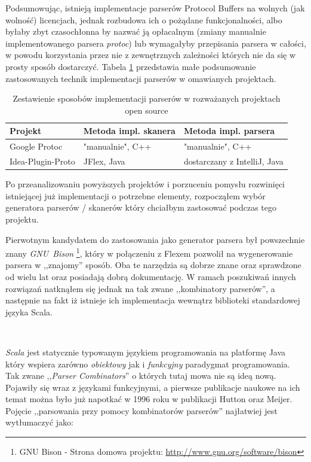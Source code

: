 \documentclass[pdflatex,11pt]{aghdpl}
\begin{document}
Podsumowując, istnieją implementacje parserów Protocol Buffers na wolnych (jak wolność) licencjach, jednak rozbudowa ich o pożądane funkcjonalności,
albo byłaby zbyt czasochłonna by nazwać ją opłacalnym (zmiany manualnie implementowanego parsera \textit{protoc}) lub wymagałyby 
przepisania parsera w całości, w powodu korzystania przez nie z zewnętrznych zależności których nie da się w prosty sposób dostarczyć.
Tabela \ref{tab:parers} przedstawia małe podsumowanie zastosowanych technik implementacji parserów w omawianych projektach.

\begin{table}[ch]
  \begin{center}
    \begin{tabular}{| l | l | l |}
      \hline
      Projekt & Metoda impl. skanera & Metoda impl. parsera\\
      \hline
      Google Protoc & "manualnie", C++ & "manualnie", C++\\
      \hline
      Idea-Plugin-Proto & JFlex, Java & dostarczany z IntelliJ, Java\\
      \hline
    \end{tabular}
    \caption{Zestawienie sposobów implementacji parserów w rozważanych projektach open source}
  \end{center}
  \label{tab:parers}
\end{table}

Po przeanalizowaniu powyższych projektów i porzuceniu pomysłu rozwinięci istniejącej już implementacji o potrzebne elementy, rozpocząłem
wybór generatora parserów / skanerów który chciałbym zastosować podczas tego projektu. 

Pierwotnym kandydatem do zastosowania jako generator parsera był powszechnie znany \textit{GNU~Bison} \footnote{GNU Bison - Strona domowa projektu: \href{http://www.gnu.org/software/bison}{http://www.gnu.org/software/bison}},
który w połączeniu z Flexem pozwolił na wygenerowanie parsera w ,,znajomy'' sposób. Oba te narzędzia są dobrze znane oraz sprawdzone od wielu lat oraz posiadają dobrą dokumentację.
W ramach poszukiwań innych rozwiązań natknąłem się jednak na tak zwane ,,kombinatory parserów'', a następnie na fakt iż istnieje ich implementacja wewnątrz
biblioteki standardowej języka Scala.

~\\\*

\textit{Scala} jest statycznie typowanym językiem programowania na platformę Java który wspiera zarówno \textit{obiektowy} jak i \textit{funkcyjny} paradygmat programowania.
Tak zwane ,,\textit{Parser Combinators}'' o których tutaj mowa nie są ideą nową. Pojawiły się wraz z językami funkcyjnymi, a pierwsze publikacje naukowe
na ich temat można było już napotkać w 1996 roku \cite{monadparsing} w publikacji Hutton oraz Meijer.
Pojęcie ,,parsowania przy pomocy kombinatorów parserów'' najłatwiej jest wytłumaczyć jako:
\end{document}
